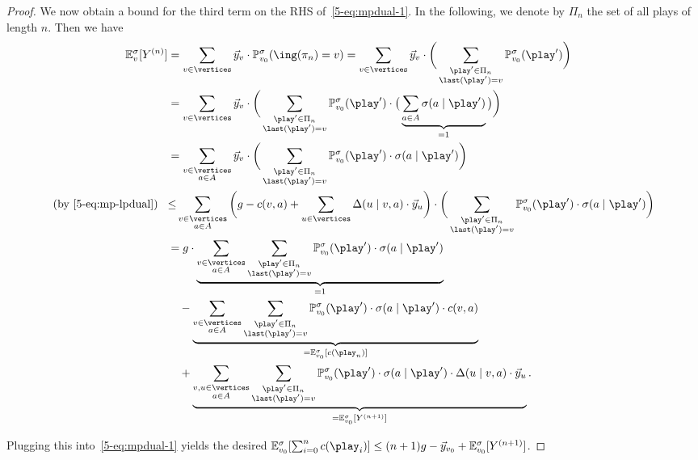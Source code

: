 \begin{proof}
\begingroup
\allowdisplaybreaks
\noindent
We now obtain a bound for the third term on the RHS of~\eqref{5-eq:mpdual-1}. In the following, we denote by $\Pi_n$ the set of all plays of length $n$. Then we have
\begin{align*}
\expv^\sigma_v [Y^{(n)}]&= \sum_{v\in\vertices}  \vec{y}_v\cdot\probm^\sigma_{\vinit}(\ing(\pi_n)=v)
=\sum_{v\in\vertices}  \vec{y}_v\cdot \bigg(\sum_{\substack{\play'\in \Pi_n\\ \last(\play')=v}}\probm^\sigma_{\vinit}(\play') \bigg) \\
&=\sum_{v\in\vertices}  \vec{y}_v\cdot \bigg(\sum_{\substack{\play'\in \Pi_n\\ \last(\play')=v}}\probm^\sigma_{\vinit}(\play')\cdot\big(\underbrace{\sum_{a\in\actions}\sigma(a\mid \play')}_{=1} \big)\bigg) \\
&= \sum_{\substack{v\in\vertices\\ a \in \actions}}  \vec{y}_v\cdot \bigg(\sum_{\substack{\play'\in \Pi_n\\ \last(\play')=v}}\probm^\sigma_{\vinit}(\play')\cdot\sigma(a\mid \play')\bigg)\\
\text{(by~\eqref{5-eq:mp-lpdual})}\hspace{3mm}
&{\leq}\sum_{\substack{v\in\vertices\\ a\in \actions}} \bigg( {g} -\colouring(v,a) + \sum_{u\in\vertices}\probTranFunc(u\mid v,a)\cdot  \vec{y}_u\bigg)\cdot\bigg(\sum_{\substack{\play'\in \Pi_n\\ \last(\play')=v}}\probm^\sigma_{\vinit}(\play')\cdot\sigma(a\mid \play')\bigg)\\
&= {g}\cdot\underbrace{\sum_{\substack{v\in\vertices\\ a\in \actions}}\sum_{\substack{\play'\in \Pi_n\\ \last(\play')=v}}\probm^\sigma_{\vinit}(\play')\cdot\sigma(a\mid \play')}_{=1}\\&\quad-\underbrace{\sum_{\substack{v\in\vertices\\ a\in \actions}}\sum_{\substack{\play'\in \Pi_n\\ \last(\play')=v}}\probm^\sigma_{\vinit}(\play')\cdot\sigma(a\mid \play')\cdot\colouring(v,a)}_{=\expv^\sigma_{\vinit}[\colouring(\play_n)]}\\
&\quad +\underbrace{\sum_{\substack{v,u\in \vertices\\ a \in \actions}}\sum_{\substack{\play'\in \Pi_n\\ \last(\play')=v}} \probm^\sigma_{\vinit}(\play')\cdot\sigma(a\mid \play')\cdot \probTranFunc(u\mid v,a)\cdot  \vec{y}_u}_{=\expv^\sigma_{\vinit}[Y^{(n+1)}]}.
\end{align*}
\endgroup

Plugging this into~\eqref{5-eq:mpdual-1} yields the desired $\expv^\sigma_{\vinit}[\sum_{i=0}^{n}\colouring(\play_i)] \leq (n+1) {g}- \vec{y}_{\vinit} + \expv^\sigma_{\vinit}[Y^{(n+1)}]$. 
\end{proof}

